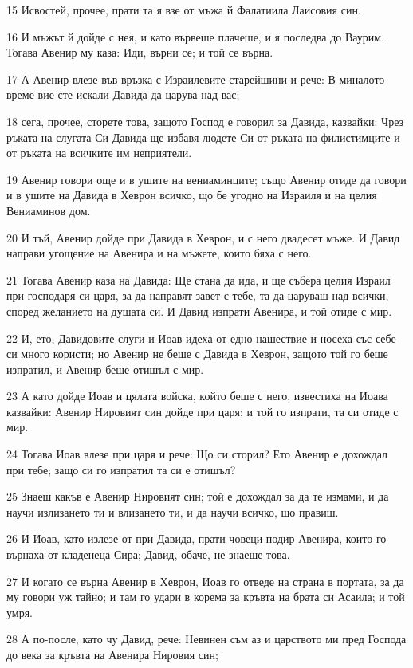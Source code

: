 \par 15 Исвостей, прочее, прати та я взе от мъжа й Фалатиила Лаисовия син.
\par 16 И мъжът й дойде с нея, и като вървеше плачеше, и я последва до Ваурим. Тогава Авенир му каза: Иди, върни се; и той се върна.
\par 17 А Авенир влезе във връзка с Израилевите старейшини и рече: В миналото време вие сте искали Давида да царува над вас;
\par 18 сега, прочее, сторете това, защото Господ е говорил за Давида, казвайки: Чрез ръката на слугата Си Давида ще избавя людете Си от ръката на филистимците и от ръката на всичките им неприятели.
\par 19 Авенир говори още и в ушите на вениаминците; също Авенир отиде да говори и в ушите на Давида в Хеврон всичко, що бе угодно на Израиля и на целия Вениаминов дом.
\par 20 И тъй, Авенир дойде при Давида в Хеврон, и с него двадесет мъже. И Давид направи угощение на Авенира и на мъжете, които бяха с него.
\par 21 Тогава Авенир каза на Давида: Ще стана да ида, и ще събера целия Израил при господаря си царя, за да направят завет с тебе, та да царуваш над всички, според желанието на душата си. И Давид изпрати Авенира, и той отиде с мир.
\par 22 И, ето, Давидовите слуги и Иоав идеха от едно нашествие и носеха със себе си много користи; но Авенир не беше с Давида в Хеврон, защото той го беше изпратил, и Авенир беше отишъл с мир.
\par 23 А като дойде Иоав и цялата войска, който беше с него, известиха на Иоава казвайки: Авенир Нировият син дойде при царя; и той го изпрати, та си отиде с мир.
\par 24 Тогава Иоав влезе при царя и рече: Що си сторил? Ето Авенир е дохождал при тебе; защо си го изпратил та си е отишъл?
\par 25 Знаеш какъв е Авенир Нировият син; той е дохождал за да те измами, и да научи излизането ти и влизането ти, и да научи всичко, що правиш.
\par 26 И Иоав, като излезе от при Давида, прати човеци подир Авенира, които го върнаха от кладенеца Сира; Давид, обаче, не знаеше това.
\par 27 И когато се върна Авенир в Хеврон, Иоав го отведе на страна в портата, за да му говори уж тайно; и там го удари в корема за кръвта на брата си Асаила; и той умря.
\par 28 А по-после, като чу Давид, рече: Невинен съм аз и царството ми пред Господа до века за кръвта на Авенира Нировия син;
